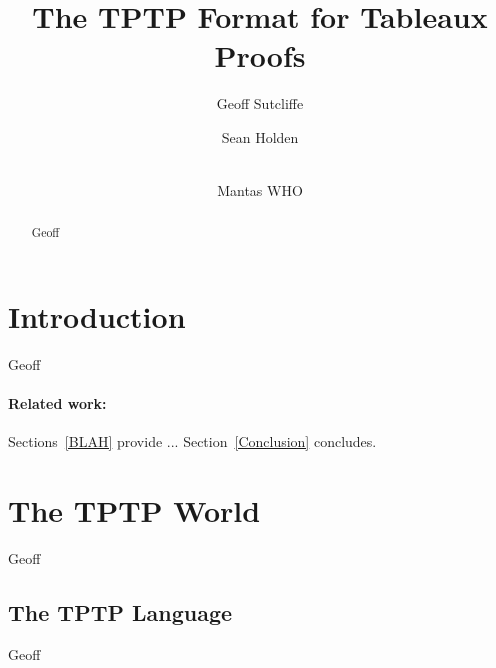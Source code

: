 \documentclass[runningheads]{llncs}
\begin{document}
\title{The TPTP Format for Tableaux Proofs}

\author{
Geoff Sutcliffe\Envelope
\and
Sean Holden
\and \\
Mantas WHO
}

\maketitle
\begin{abstract}
Geoff

\end{abstract}
\section{Introduction}
\label{Introduction}

Geoff

\paragraph{Related work:}

Sections~\ref{BLAH} provide ...
Section~\ref{Conclusion} concludes.

\section{The TPTP World}
\label{TPTP}

Geoff

\subsection{The TPTP Language}
\label{TPTPLanguage}

Geoff

\end{document}
